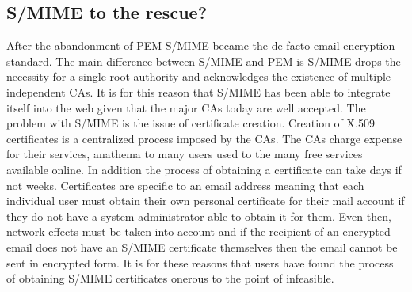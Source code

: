 \documentclass{article}
\begin{document}
\subsection{S/MIME to the rescue?}
\par After the abandonment of PEM S/MIME became the de-facto email encryption standard. The main difference between S/MIME and PEM is S/MIME drops the necessity for a single root authority and acknowledges the existence of multiple independent CAs\cite{garfinkel2005make}. It is for this reason that S/MIME has been able to integrate itself into the web given that the major CAs today are well accepted. The problem with S/MIME is the issue of certificate creation. Creation of X.509 certificates is a centralized process imposed by the CAs\cite{garfinkel2005johnny}. The CAs charge expense for their services, anathema to many users used to the many free services available online. In addition the process of obtaining a certificate can take days if not weeks. Certificates are specific to an email address meaning that each individual user must obtain their own personal certificate for their mail account if they do not have a system administrator able to obtain it for them. Even then, network effects must be taken into account and if the recipient of an encrypted email does not have an S/MIME certificate themselves then the email cannot be sent in encrypted form. It is for these reasons that users have found the process of obtaining S/MIME certificates onerous to the point of infeasible\cite{garfinkel2005johnny}.
\end{document}
